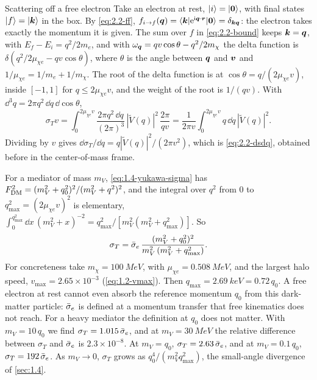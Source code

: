 \begin{workedexample}{Scattering off a free electron}\label{we:2-free}
Take an electron at rest, $|i\rangle = |\bm{0}\rangle$, with final states $|f\rangle = |\bm{k}\rangle$ in the box. By \cref{eq:2.2-ff}, $f_{i\to f}(\bm{q}) = \langle\bm{k}|\mathrm{e}^{\mathrm{i}\bm{q}\cdot\bm{r}}|\bm{0}\rangle = \delta_{\bm{k}\bm{q}}$: the electron takes exactly the momentum it is given. The sum over $f$ in \cref{eq:2.2-bound} keeps $\bm{k} = \bm{q}$, with $E_f - E_i = q^2/2m_e$, and with $\omega_{\bm{q}} = qv\cos\theta - q^2/2m_\chi$ the delta function is $\delta(q^2/2\mu_{\chi e} - qv\cos\theta)$, where $\theta$ is the angle between $\bm{q}$ and $\bm{v}$ and $1/\mu_{\chi e} = 1/m_e + 1/m_\chi$. The root of the delta function is at $\cos\theta = q/(2\mu_{\chi e}v)$, inside $[-1, 1]$ for $q \le 2\mu_{\chi e}v$, and the weight of the root is $1/(qv)$. With $\dd^3q = 2\pi q^2\,\dd q\,\dd\cos\theta$,
\begin{equation*}
  \sigma_T v = \int_0^{2\mu_{\chi e}v}\frac{2\pi q^2\,\dd q}{(2\pi)^3}\,|\tilde V(q)|^2\,\frac{2\pi}{qv}
  = \frac{1}{2\pi v}\int_0^{2\mu_{\chi e}v}q\,\dd q\,|\tilde V(q)|^2 .
\end{equation*}
Dividing by $v$ gives $\dd\sigma_T/\dd q = q|\tilde V(q)|^2/(2\pi v^2)$, which is \cref{eq:2.2-dsdq}, obtained before in the center-of-mass frame.

For a mediator of mass $m_V$, \cref{eq:1.4-yukawa-sigma} has $F_{\mathrm{DM}}^2 = (m_V^2 + q_0^2)^2/(m_V^2 + q^2)^2$, and the integral over $q^2$ from $0$ to $q_{\mathrm{max}}^2 = (2\mu_{\chi e}v)^2$ is elementary, $\int_0^{q_{\mathrm{max}}^2}\dd x\,(m_V^2 + x)^{-2} = q_{\mathrm{max}}^2/[m_V^2(m_V^2 + q_{\mathrm{max}}^2)]$. So
\begin{equation*}
  \sigma_T = \bar{\sigma}_{e}\,\frac{(m_V^2 + q_0^2)^2}{m_V^2\,(m_V^2 + q_{\mathrm{max}}^2)} .
\end{equation*}
For concreteness take $m_\chi = \SI{100}{MeV}$, with $\mu_{\chi e} = \SI{0.508}{MeV}$, and the largest halo speed, $v_{\mathrm{max}} = 2.65\times10^{-3}$ (\cref{eq:1.2-vmax}). Then $q_{\mathrm{max}} = \SI{2.69}{keV} = 0.72\,q_0$. A free electron at rest cannot even absorb the reference momentum $q_0$ from this dark-matter particle: $\bar{\sigma}_{e}$ is defined at a momentum transfer that free kinematics does not reach. For a heavy mediator the definition at $q_0$ does not matter. With $m_V = 10\,q_0$ we find $\sigma_T = 1.015\,\bar{\sigma}_{e}$, and at $m_V = \SI{30}{MeV}$ the relative difference between $\sigma_T$ and $\bar{\sigma}_{e}$ is $2.3\times10^{-8}$. At $m_V = q_0$, $\sigma_T = 2.63\,\bar{\sigma}_{e}$, and at $m_V = 0.1\,q_0$, $\sigma_T = 192\,\bar{\sigma}_{e}$. As $m_V \to 0$, $\sigma_T$ grows as $q_0^4/(m_V^2q_{\mathrm{max}}^2)$, the small-angle divergence of \cref{sec:1.4}.
\end{workedexample}


